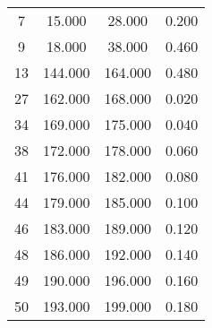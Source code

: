 % 
\begin{tabular}{cccc}
  \hline
  \hline
7 & 15.000 & 28.000 & 0.200 \\ 
  9 & 18.000 & 38.000 & 0.460 \\ 
  13 & 144.000 & 164.000 & 0.480 \\ 
  27 & 162.000 & 168.000 & 0.020 \\ 
  34 & 169.000 & 175.000 & 0.040 \\ 
  38 & 172.000 & 178.000 & 0.060 \\ 
  41 & 176.000 & 182.000 & 0.080 \\ 
  44 & 179.000 & 185.000 & 0.100 \\ 
  46 & 183.000 & 189.000 & 0.120 \\ 
  48 & 186.000 & 192.000 & 0.140 \\ 
  49 & 190.000 & 196.000 & 0.160 \\ 
  50 & 193.000 & 199.000 & 0.180 \\ 
   \hline
\end{tabular}
